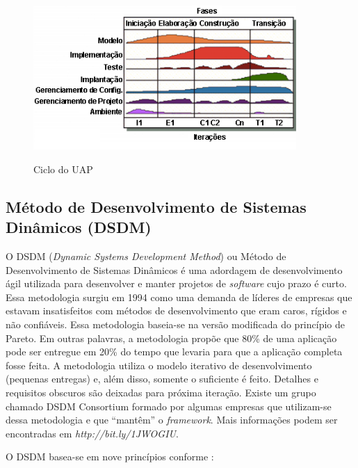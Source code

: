 \begin{figure}[htb!]
\begin{center}
\caption{Ciclo do UAP}
\label{fig:uap}
\includegraphics[width=10cm]{assets/uap} \\
\end{center}
\end{figure}

\subsection{Método de Desenvolvimento de Sistemas Dinâmicos (DSDM)}

O DSDM (\textit{Dynamic Systems Development Method}) ou Método de Desenvolvimento de Sistemas Dinâmicos é uma adordagem de desenvolvimento ágil utilizada para desenvolver e manter projetos de \textit{software} cujo prazo é curto. Essa metodologia surgiu em 1994 como uma demanda de líderes de empresas que estavam insatisfeitos com métodos de desenvolvimento que eram caros, rígidos e não confiáveis. Essa metodologia baseia-se na versão modificada do princípio de Pareto. Em outras palavras, a metodologia propõe que 80\% de uma aplicação pode ser entregue em 20\% do tempo que levaria para que a aplicação completa fosse feita. A metodologia utiliza o modelo iterativo de desenvolvimento (pequenas entregas) e, além disso, somente o suficiente é feito. Detalhes e requisitos obscuros são deixadas para próxima iteração. Existe um grupo chamado DSDM Consortium formado por algumas empresas que utilizam-se dessa metodologia e que ``mantêm'' o \textit{framework}. Mais informações podem ser encontradas em \textit{http://bit.ly/1JWOGIU}. \cite{pressman:11} \cite{dsdm:2015}

O DSDM basea-se em nove princípios conforme :

